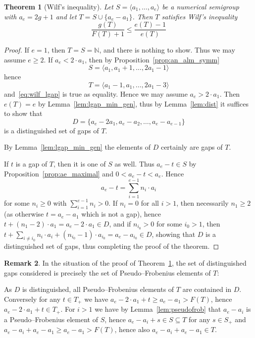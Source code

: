 \documentclass[a4paper,12pt,scrbook]{amsart}
\def \N{\mathbb N}
\theoremstyle{plain}%
\newtheorem{satz}{Theorem}[section]
\theoremstyle{definition}
\newtheorem{rem}[satz]{Remark}
\begin{document}
\begin{satz}[Wilf's inequality]\label{thm:lgap_wilf}
Let $S = \langle a_1, \ldots, a_e \rangle $ be a numerical semigroup 
with $a_e = 2g+1$ and let $T = S \cup \{a_e-a_1\} $. Then $T$ 
satisfies Wilf's inequality 
	\begin{equation}\label{eq:wilf_lgap}
	\frac {g(T)}{F(T)+1} \leq \frac {e(T)-1}{e(T)}
	\end{equation}
\end{satz} 

\begin{proof}
If $e=1$, then $T=S=\N$, and there is nothing to show. Thus we may assume $e \geq 2$. 
If $a_e < 2 \cdot a_1$, then by Proposition~\ref{prop:an_alm_symm}
	\[S=\langle a_1,a_1+1,\dots,2a_1-1\rangle\]
hence 
	\[T=\langle a_1-1,a_1,\dots,2a_1-3\rangle\]
and~\eqref{eq:wilf_lgap} is true as equality. Hence we may assume $a_e > 2 \cdot a_1$. 
Then $e(T) = e$ by Lemma~\ref{lem:lgap_min_gen}, thus by Lemma~\ref{lem:dist} it 
suffices to show that 
	$$ D = \{a_e - 2 a_1, a_e - a_2, \ldots, a_e-a_{e-1} \} $$
is a distinguished set of gaps of $T$. 

By Lemma~\ref{lem:lgap_min_gen} the elements of $D$ certainly are gaps of $T$. 

If $t$ is a gap of $T$, then it is one of $S$ as well. Thus $a_e-t \in S$ by 
Proposition~\ref{prop:ae_maximal} and $0 < a_e -t < a_e$. Hence 
	$$ a_e -t = \sum\limits_{i=1}^{e-1} n_i \cdot a_i $$
for some $n_i \geq 0$ with $\sum\limits_{i=1}^{e-1} n_i > 0$. If $n_i = 0$ for all 
$i > 1$, then necessarily $n_1\geq 2$ (as otherwise $t = a_e-a_1$ which is not a gap), 
hence $t + (n_1-2) \cdot a_1 = a_e-2 \cdot a_1 \in D$, and if $n_{i_0}>0$ for some 
$i_0 > 1$, then $t + \sum\limits_{i\neq i_0} n_i \cdot a_i + (n_{i_0} - 1) \cdot a_{i_0} 
= a_e - a_{i_0} \in D$, showing that $D$ is a distinguished set of gaps, thus completing 
the proof of the theorem. 
\end{proof}


\begin{rem} 
In the situation of the proof of Theorem~\ref{thm:lgap_wilf}, the set of 
distinguished gaps considered is precisely the set of Pseudo--Frobenius 
elements of $T$: 

As $D$ is distinguished, all Pseudo--Frobenius elements of $T$ are 
contained in $D$. Conversely for any $t \in T_+$ we have 
$a_e - 2 \cdot a_1 + t \geq a_e - a_1 > F(T)$, hence 
$a_e - 2 \cdot a_1 + t \in T_+$. For $i > 1$ we have by 
Lemma~\ref{lem:pseudofrob} that $a_e-a_i$ is a Pseudo--Frobenius 
element of $S$, hence $a_e-a_i + s \in S \subseteq T$ for 
any $s \in S_+$ and $a_e-a_i+ a_e-a_1 \geq a_e-a_1 > F(T)$, 
hence also $a_e-a_i+ a_e-a_1 \in T$.
\end{rem}
\end{document}
